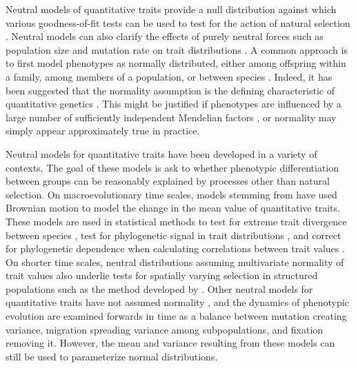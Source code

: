 Neutral models of quantitative traits provide a null distribution against which
various goodness-of-fit tests can be used to test for the action of natural
selection \citep{Lande1976,Leinonen2013}. Neutral models can also clarify the
effects of purely neutral forces such as population size and mutation rate on
trait distributions \citep{Lynch1986}. A common approach is to first model
phenotypes as normally distributed, either among offspring within a family,
among members of a population, or between species \citep{Turelli2017}. Indeed,
it has been suggested that the normality assumption is the defining
characteristic of quantitative genetics \citep{Rice2004}. This might be
justified if phenotypes are influenced by a large number of sufficiently
independent Mendelian factors \citep{Fisher1918}, or normality may simply appear
approximately true in practice.

Neutral models for quantitative traits have been developed in a variety of
contexts. The goal of these models is ask to whether phenotypic differentiation
between groups can be reasonably explained by processes other than natural
selection. On macroevolutionary time scales, models stemming
from \citet{Lande1976} have used Brownian motion to model the change in the mean
value of quantitative traits. These models are used in statistical methods to
test for extreme trait divergence between species \citep{Turelli1988}, test for
phylogenetic signal in trait distributions \citep{Freckleton2002}, and correct
for phylogenetic dependence when calculating correlations between trait
values \citep{Felsenstein1985}. On shorter time scales, neutral distributions
assuming multivariate normality of trait values also underlie tests for
spatially varying selection in structured populations such as the method
developed by \citet{Ovaskainen2011}. Other neutral models for quantitative
traits have not assumed normality \citep{Chakraborty1982,Lynch1986,Lande1992},
and the dynamics of phenotypic evolution are examined forwards in time as a
balance between mutation creating variance, migration spreading variance among
subpopulations, and fixation removing it. However, the mean and variance
resulting from these models can still be used to parameterize normal
distributions.

